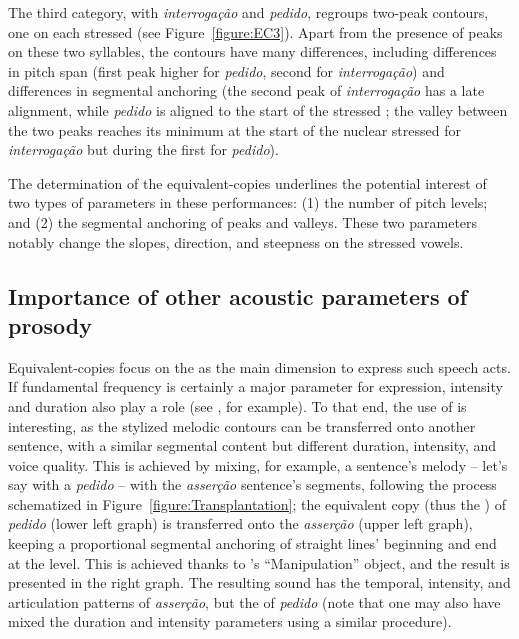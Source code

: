 \documentclass[output=paper]{LSP/langsci}
\begin{document}
The third category, with \textit{interrogação} and \textit{pedido}, regroups two-peak contours, one on each stressed  (see Figure~\ref{figure:EC3}). 
Apart from the presence of peaks on these two syllables, the contours have many differences, including differences in pitch span (first peak higher for \textit{pedido}, second for \textit{interrogação}) and differences in segmental anchoring (the second peak of \textit{interrogação} has a late alignment, while \textit{pedido} is aligned to the start of the stressed ; the valley between the two peaks reaches its minimum at the start of the nuclear stressed  for \textit{interrogação} but during the first   for \textit{pedido}).

The determination of the equivalent-copies underlines the potential interest of two types of parameters in these performances: 
(1) the number of pitch levels; 
and (2) the segmental anchoring of peaks and valleys.
These two parameters notably change the slopes, direction, and steepness on the stressed vowels.

\subsection{Importance of other acoustic parameters of prosody}
\label{corpus:importance}

Equivalent-copies focus on the  as the main dimension to express such speech acts. 
If fundamental frequency is certainly a major parameter for  expression, intensity and duration also play a role (see \citealt{kochanski2005loudness}, for example). 
To that end, the use of  is interesting, as the stylized melodic contours can be transferred onto another sentence, with a similar segmental content but different duration, intensity, and voice quality. 
This is achieved by mixing, for example, a sentence's melody -- let's say with a \textit{pedido}  -- with the \textit{asserção} sentence's segments, following the process schematized in Figure~\ref{figure:Transplantation}; the equivalent copy (thus the ) of \textit{pedido} (lower left graph) is transferred onto the \textit{asserção} (upper left graph), keeping a proportional segmental anchoring of straight lines' beginning and end at the  level. 
This is achieved thanks to 's ``Manipulation'' object, and the result is presented in the right graph. 
The resulting sound has the temporal, intensity, and articulation patterns of \textit{asserção}, but the  of \textit{pedido} (note that one may also have mixed the duration and intensity parameters using a similar procedure).
\end{document}
